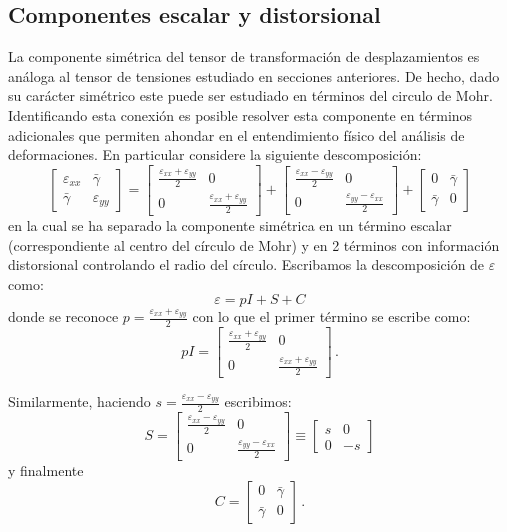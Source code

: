 \documentclass[../notas medios.tex]{subfiles}
\begin{document}
\subsection{Componentes escalar y distorsional}
La componente simétrica del tensor de transformación de desplazamientos es 
análoga al tensor de tensiones estudiado en secciones anteriores. De hecho, 
dado su carácter simétrico este puede ser estudiado en términos del circulo de 
Mohr. Identificando esta conexión es posible resolver esta componente en 
términos adicionales que permiten ahondar en el entendimiento físico del 
análisis de deformaciones. En particular considere la siguiente descomposición:
\begin{equation}
\begin{bmatrix}
\varepsilon_{xx} &\bar{\gamma} \\
\bar{\gamma} &\varepsilon_{yy}
\end{bmatrix} = \begin{bmatrix}
\frac{\varepsilon_{xx} + \varepsilon_{yy}}{2} &0\\
0 &\frac{\varepsilon_{xx} + \varepsilon_{yy}}{2}
\end{bmatrix} + \begin{bmatrix}
\frac{\varepsilon_{xx} - \varepsilon_{yy}}{2} &0\\
0 &\frac{\varepsilon_{yy} - \varepsilon_{xx}}{2}
\end{bmatrix} + \begin{bmatrix}
0 &\bar{\gamma} \\
\bar{\gamma} &0
\end{bmatrix}
\label{otras}
\end{equation}
en la cual se ha separado la componente simétrica en un término escalar 
(correspondiente al centro del círculo de Mohr) y en 2 términos con información 
distorsional controlando el radio del círculo. Escribamos la descomposición de 
$\varepsilon$ como:
\[\varepsilon  = pI + S + C\]
donde se reconoce $p=\frac{\varepsilon_{xx} + \varepsilon_{yy}}{2}$ 
con lo que el primer término se escribe como:
\[pI = \begin{bmatrix}
\frac{\varepsilon_{xx} + \varepsilon_{yy}}{2} &0\\
0 &\frac{\varepsilon_{xx} + \varepsilon_{yy}}{2}
\end{bmatrix}\, .\]

Similarmente, haciendo $s = \frac{\varepsilon_{xx} - \varepsilon_{yy}}{2}$ 
escribimos:
\[S = \begin{bmatrix}
\frac{\varepsilon_{xx} - \varepsilon_{yy}}{2} &0\\
0 &\frac{\varepsilon_{yy} - \varepsilon_{xx}}{2}
\end{bmatrix} \equiv \begin{bmatrix}
s &0\\
0 &-s
\end{bmatrix}\]
y finalmente
\[C = \begin{bmatrix}
0 &\bar{\gamma} \\
\bar{\gamma} &0
\end{bmatrix}\, .\]
\end{document}

